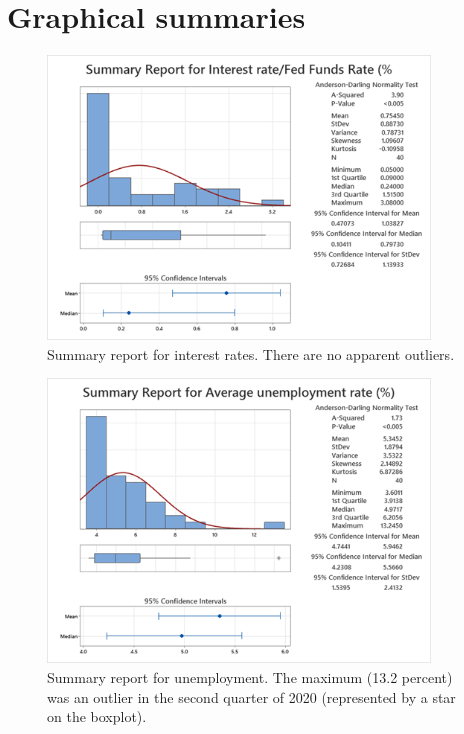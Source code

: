 \documentclass[12pt]{article}
\begin{document}
\section{Graphical summaries}
\label{sec:graphicalsummaries}
\begin{figure}
\begin{center}
\includegraphics[width=4in]{images/interest-rate-summary.png}
\end{center}
\caption{Summary report for interest rates. There are no apparent outliers.\label{fig:interestratesummary}}
\end{figure}
\begin{figure}
\begin{center}
\includegraphics[width=4in]{images/unemployment-summary.png}
\end{center}
\caption{Summary report for unemployment. The maximum (13.2 percent) was an outlier in the second quarter of 2020 (represented by a star on the boxplot).\label{fig:unemploymentsummary}}
\end{figure}
\end{document}
